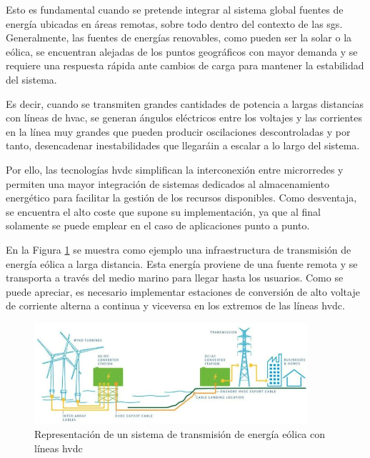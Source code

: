 \vspace{3mm}

Esto es fundamental cuando se pretende integrar al sistema global fuentes de energía ubicadas en áreas remotas, sobre todo dentro del contexto de las \gls{sg}s. Generalmente, las fuentes de energías renovables, como pueden ser la solar o la eólica, se encuentran alejadas de los puntos geográficos con mayor demanda y se requiere una respuesta rápida ante cambios de carga para mantener la estabilidad del sistema. 

\vspace{3mm}

Es decir, cuando se transmiten grandes cantidades de potencia a largas distancias con líneas de \gls{hvac}, se generan ángulos eléctricos entre los voltajes y las corrientes en la línea muy grandes que pueden producir oscilaciones descontroladas y por tanto, desencadenar inestabilidades que llegaráin a escalar a lo largo del sistema. 

\vspace{3mm}

Por ello, las tecnologías \gls{hvdc} simplifican la interconexión entre microrredes y permiten una mayor integración de sistemas dedicados al almacenamiento energético para facilitar la gestión de los recursos disponibles. Como desventaja, se encuentra el alto coste que supone su implementación, ya que al final solamente se puede emplear en el caso de aplicaciones punto a punto.

\vspace{3mm}

En la Figura \ref{fig:hvdc} se muestra como ejemplo una infraestructura de transmisión de energía eólica a larga distancia. Esta energía proviene de una fuente remota y se transporta a través del medio marino para llegar hasta los usuarios. Como se puede apreciar, es necesario implementar estaciones de conversión de alto voltaje de corriente alterna a continua y viceversa en los extremos de las líneas \gls{hvdc}.

\begin{figure}[h!]
  \centering
  \includegraphics[width=0.9\textwidth]{img/teoria/hvdc.png}
  \caption{Representación de un sistema de transmisión de energía eólica con líneas \acrshort{hvdc} \cite{hvdc2}}
  \label{fig:hvdc}
\end{figure}

